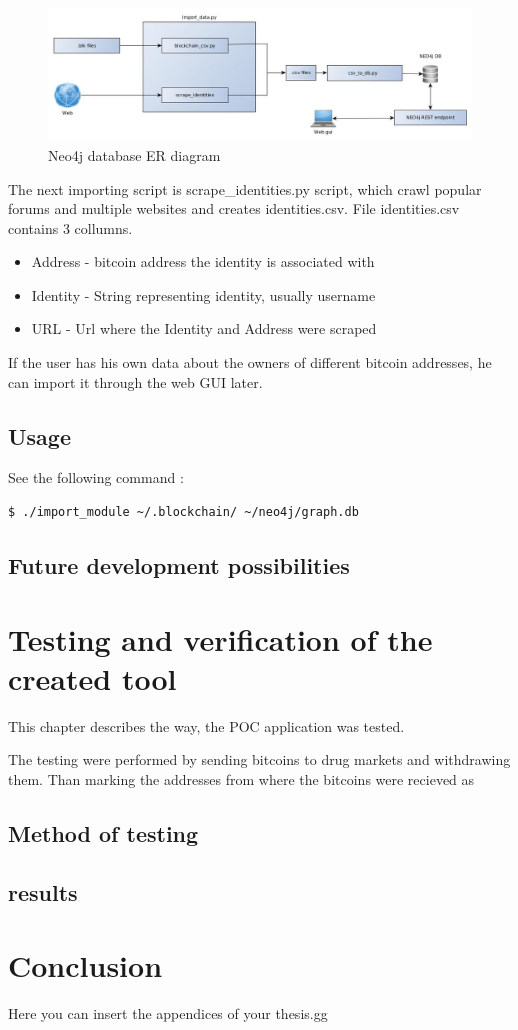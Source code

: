\documentclass[
  digital, %
  table,   %
  lof,     %
  lot,     %
  oneside
]{fithesis3}
\begin{document}
\begin{figure}[!htb]
    \centering
    \includegraphics[width=1\textwidth]{application_architecture}
    \caption{Neo4j database ER diagram}
    \label{application_architecture}
\end{figure}

The next importing script is scrape\_identities.py script, which crawl popular forums and multiple websites and creates identities.csv.
File identities.csv contains 3 collumns.
\begin{itemize}
  \item Address - bitcoin address the identity is associated with
  \item Identity - String representing identity, usually username
  \item URL - Url where the Identity and Address were scraped
\end{itemize}

If the user has his own data about the owners of different bitcoin addresses, he can import it through the web GUI later.


\section{Usage}

\noindent See the following command :
\begin{lstlisting}[language=bash]
  $ ./import_module ~/.blockchain/ ~/neo4j/graph.db
\end{lstlisting}

\section{Future development possibilities}


\chapter{Testing and verification of the created tool}
This chapter describes the way, the POC application was tested.

The testing were performed by sending bitcoins to drug markets and withdrawing them.
Than marking the addresses from where the bitcoins were recieved as 

\section{Method of testing}
\section{results}



\chapter{Conclusion}

Here you can insert the appendices of your thesis.gg

\printbibliography
\end{document}
